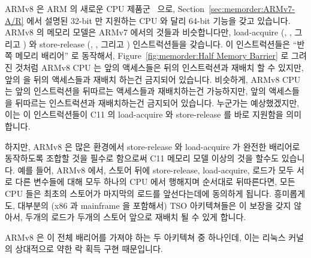 ARMv8 은 ARM 의 새로운 CPU 제품군~\cite{ARMv8A:2017} 으로,
Section~\ref{sec:memorder:ARMv7-A/R} 에서 설명된 32-bit 만 지원하는 CPU 와 달리
64-bit 기능을 갖고 있습니다.
ARMv8 의 메모리 모델은 ARMv7 에서의 것들과 비슷합니다만, load-acquire
(, , 그리고 ) 와 store-release (,
, 그리고 ) 인스트럭션들을 갖습니다.
이 인스트럭션들은 ``반쪽 메모리 배리어'' 로 동작해서,
Figure~\ref{fig:memorder:Half Memory Barrier} 로 그려진 것처럼 ARMv8 CPU 는
앞의 액세스들은 뒤의  인스트럭션과 재배치 할 수 있지만, 앞의
 을 뒤의 액세스들과 재배치 하는건 금지되어 있습니다.
비슷하게, ARMv8 CPU 는 앞의  인스트럭션을 뒤따르는 액세스들과
재배치하는건 가능하지만, 앞의 액세스들을 뒤따르는  인스트럭션과
재배치하는건 금지되어 있습니다.
누군가는 예상했겠지만, 이는 이 인스트럭션들이 C11 의 load-acquire 와
store-release 를 바로 지원함을 의미합니다.

하지만, ARMv8 은 많은 환경에서 store-release 와 load-acquire 가 완전한 배리어로
동작하도록 조합할 것을 필수로 함으로써 C11 메모리 모델 이상의 것을 할수도
있습니다.
예를 들어, ARMv8 에서, 스토어 뒤에 store-release, load-acquire, 로드가 모두
서로 다른 변수들에 대해 모두 하나의 CPU 에서 행해지며 순서대로 뒤따른다면, 모든
CPU 들은 최초의 스토어가 마지막의 로드를 앞선다는데에 동의하게 됩니다.
흥미롭게도, 대부분의 (x86 과 mainframe 을 포함해서) TSO 아키텍쳐들은 이 보장을
갖지 않아서, 두개의 로드가 두개의 스토어 앞으로 재배치 될 수 있게 합니다.

ARMv8 은  이 전체 배리어를 가져야 하는 두 아키텍쳐
중 하나인데, 이는 리눅스 커널의 상대적으로 약한 락 획득 구현 때문입니다.

